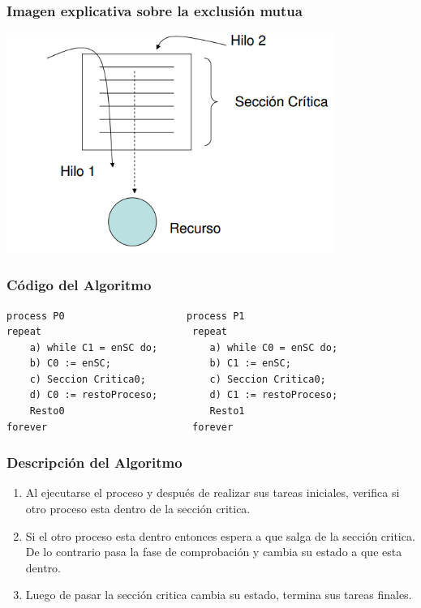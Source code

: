 \documentclass{beamer}
\begin{document}
\begin{frame}[fragile]

\frametitle{Imagen explicativa sobre la exclusión mutua} \vspace*{-0.8 cm}
 \includegraphics[width=0.8\textwidth]{exclmu.png}

\end{frame}

\begin{frame}[fragile]
\frametitle{Código del Algoritmo}    
\begin{Verbatim}[frame=single]
    process P0                     process P1
repeat                          repeat
    a) while C1 = enSC do;         a) while C0 = enSC do;
    b) C0 := enSC;                 b) C1 := enSC;
    c) Seccion Critica0;           c) Seccion Critica0;
    d) C0 := restoProceso;         d) C1 := restoProceso;
    Resto0                         Resto1
forever                         forever
\end{Verbatim}
\end{frame}

\begin{frame}

\frametitle{Descripción del Algoritmo}
\begin{enumerate}[$*$]
\item Al ejecutarse el proceso y después de realizar sus tareas iniciales, verifica si otro proceso 
esta dentro de la sección critica. 
\item Si el otro proceso esta dentro entonces espera a que salga de la sección critica. De lo 
contrario pasa la fase de comprobación y cambia su estado a que esta dentro. 
\item Luego de pasar la sección critica cambia su estado, termina sus tareas finales.
\end{enumerate}

\end{frame}
\end{document}
